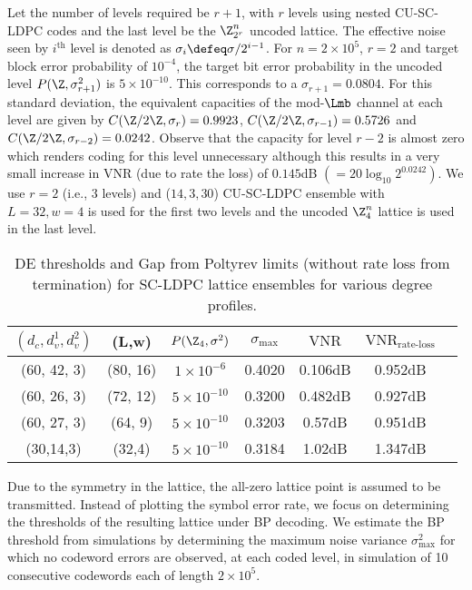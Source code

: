 \documentclass[conference]{IEEEtran}
\begin{document}
Let the number of levels required be $r+1$, with $r$ levels using nested CU-SC-LDPC codes and the last level be the $\Z_{2^r}^{n}$ uncoded lattice. The effective noise seen by $i^{\text{th}}$ level is denoted as $\sigma_{i}\defeq\sigma/2^{i-1}$. For $n=2 \times 10^{5}$, $r=2$ and target block error probability of $10^{-4}$, the target bit error probability in the uncoded level $P(\Z,\sigma_{r+1}^{2})$ is $5 \times 10^{-10}$. This corresponds to a $\sigma_{r+1}= 0.0804$. For this standard deviation, the equivalent capacities of the mod-$\Lmb$ channel at each level are given by $C(\Z/2\Z,\sigma_{r})=0.9923$,
$C(\Z/2\Z,\sigma_{r-1})=0.5726$ and $C(\Z/2\Z,\sigma_{r-2})=0.0242$. Observe that the capacity for level $r-2$ is almost zero which renders coding for this level unnecessary although this results in a very small increase in VNR (due to rate the loss) of $0.145$dB $(=20\log_{10}2^{0.0242})$. We use $r=2$ (i.e., 3 levels) and ($14,3,30$) CU-SC-LDPC ensemble with $L=32, w=4$ is used for the first two levels and the uncoded $\Z_{4}^{n}$ lattice is used in the last level.
\begin{table}
\centering
\caption{DE thresholds and Gap from Poltyrev limits (without rate loss from termination) for SC-LDPC lattice ensembles for various degree profiles.}
\begin{tabular}{c c c c c c c}
\hline  \hline
$(d_{c},d_{v}^{1},d_{v}^{2})$ &(L,w)& $P(\Z_{4},\sigma^{2})$ & $\sigma_{\text{max}}$ &$\text{VNR}$ &$\text{VNR}_{\text{rate-loss}}$\\
\hline
(60, 42, 3)& (80, 16)& $1 \times 10^{-6}$ & 0.4020 & 0.106dB &0.952dB\\
(60, 26, 3)& (72, 12)& $5 \times 10^{-10}$ & 0.3200 &0.482dB & 0.927dB\\
(60, 27, 3)& (64, 9)& $5 \times 10^{-10}$  &  0.3203 & 0.57dB & 0.951dB\\
(30,14,3) & (32,4) & $5 \times 10^{-10}$ & 0.3184 & 1.02dB & 1.347dB
\end{tabular}
\label{Table:Thresholds}
\end{table}
Due to the symmetry in the lattice, the all-zero lattice point is assumed to be transmitted. Instead of plotting the symbol error rate, we focus on determining the thresholds of the resulting lattice under BP decoding. We estimate the BP threshold from simulations by determining the maximum noise variance $\sigma_{\text{max}}^{2}$ for which no codeword errors are observed, at each coded level,  in simulation of 10 consecutive codewords each of length $2\times 10^{5}$.
\end{document}
